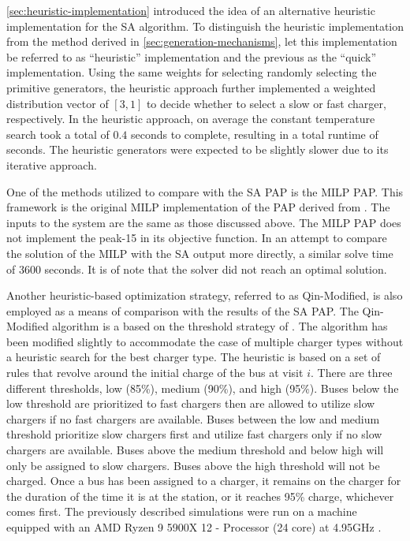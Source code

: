 \documentclass[11pt,a4paper,final]{article}
\newcommand{\tempcnt}{9101 }                                                    %
\newcommand{\heuristiclocal}{0.4 }                                             %
\begin{document}
\ref{sec:heuristic-implementation} introduced the idea of an alternative heuristic implementation for the SA algorithm. To
distinguish the heuristic implementation from the method derived in \ref{sec:generation-mechanisms}, let this implementation
be referred to as ``heuristic'' implementation and the previous as the ``quick'' implementation. Using the same weights for
selecting randomly selecting the primitive generators, the heuristic approach further implemented a weighted
distribution vector of \([3, 1]\) to decide whether to select a slow or fast charger, respectively. In the heuristic
approach, on average the constant temperature search took a total of \(\heuristiclocal\) seconds to complete, resulting in
a total runtime of \fpeval{\heuristiclocal * \tempcnt} seconds. The heuristic generators were expected to be
slightly slower due to its iterative approach.

One of the methods utilized to compare with the SA PAP is the MILP PAP. This framework is the original MILP
implementation of the PAP derived from \cite{qarebagh-2019-optim-sched}. The inputs to the system are the same as those
discussed above. The MILP PAP does not implement the peak-15 in its objective function. In an attempt to compare the
solution of the MILP with the SA output more directly, a similar solve time of 3600 seconds. It is of note that the
solver did not reach an optimal solution.

Another heuristic-based optimization strategy, referred to as Qin-Modified, is also employed as a means of comparison
with the results of the SA PAP. The Qin-Modified algorithm is a based on the threshold strategy of
\cite{qin-2016-numer-analy}. The algorithm has been modified slightly to accommodate the case of multiple charger types
without a heuristic search for the best charger type. The heuristic is based on a set of rules that revolve around the
initial charge of the bus at visit \(i\). There are three different thresholds, low (85\%), medium (90\%), and high (95\%).
Buses below the low threshold are prioritized to fast chargers then are allowed to utilize slow chargers if no fast
chargers are available. Buses between the low and medium threshold prioritize slow chargers first and utilize fast
chargers only if no slow chargers are available. Buses above the medium threshold and below high will only be assigned
to slow chargers. Buses above the high threshold will not be charged. Once a bus has been assigned to a charger, it
remains on the charger for the duration of the time it is at the station, or it reaches 95\% charge, whichever comes
first. The previously described simulations were run on a machine equipped with an AMD Ryzen 9 5900X 12 -
Processor (24 core) at 4.95GHz \cite{gurobi-2021-gurob-optim}.
\end{document}

